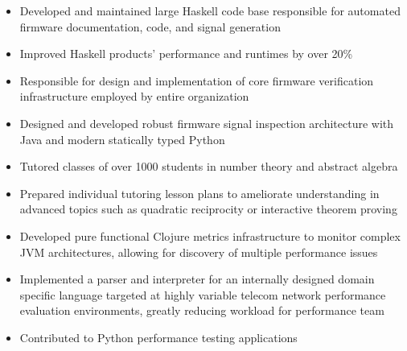\documentclass[10pt,a4paper]{altacv}
\newenvironment{tightitemize} %
{\begin{itemize}\itemsep1pt \parskip0pt \parsep0pt}
{\end{itemize}\vspace{-\topsep}}
\begin{document}
\begin{tightitemize}
\item Developed and maintained large Haskell code base responsible for automated firmware 
    documentation, code, and signal generation
\item Improved Haskell products' performance and runtimes by over 20\%
\item Responsible for design and implementation of core firmware
    verification infrastructure employed by entire organization
\item Designed and developed robust firmware signal inspection architecture with 
    Java and modern statically typed Python
\end{tightitemize}

\smallskip
\divider

\begin{tightitemize}
\item Tutored classes of over 1000 students in number theory and abstract algebra
\item Prepared individual tutoring lesson plans to ameliorate 
    understanding in advanced topics such as quadratic reciprocity or 
    interactive theorem proving
\end{tightitemize}

\smallskip
\divider

\begin{tightitemize}
    \item Developed pure functional Clojure metrics infrastructure to monitor 
        complex JVM architectures, allowing for discovery of multiple 
        performance issues
    \item Implemented a parser and interpreter for an internally designed domain 
        specific language targeted at highly variable telecom network 
        performance evaluation environments, greatly reducing workload for 
        performance team
    \item Contributed to Python performance testing applications
\end{tightitemize}

\smallskip
\divider
\end{document}
